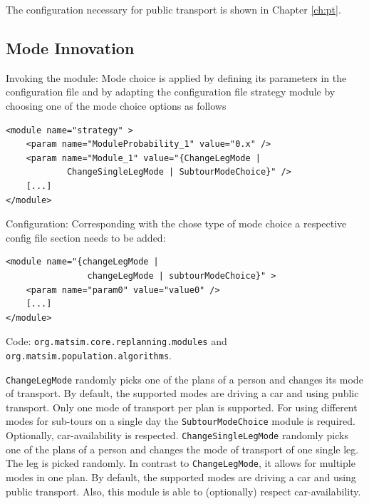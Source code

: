 The configuration necessary for public transport is shown in Chapter \ref{ch:pt}.  

\subsection{Mode Innovation}
\label{sec:modechoice}
\begin{compactitem}
\item Invoking the module: Mode choice is applied by defining its parameters in the configuration file and by adapting the configuration file strategy module by choosing one of the mode choice options as follows
\begin{lstlisting}
<module name="strategy" >
    <param name="ModuleProbability_1" value="0.x" />
    <param name="Module_1" value="{ChangeLegMode |
    		ChangeSingleLegMode | SubtourModeChoice}" />
    [...]
</module>
\end{lstlisting}
%
\item Configuration: Corresponding with the chose type of mode choice a respective config file section needs to be added:
%
\begin{lstlisting}
<module name="{changeLegMode |
				changeLegMode | subtourModeChoice}" >
    <param name="param0" value="value0" />
    [...]
</module>
\end{lstlisting}
%
\item Code: \lstinline|org.matsim.core.replanning.modules| and \lstinline|org.matsim.population.algorithms|.
\end{compactitem}

\lstinline|ChangeLegMode| randomly picks one of the plans of a person and changes its mode of transport. By default, the supported modes are driving a car and using public transport. Only one mode of transport per plan is supported. For using different modes for sub-tours on a single day the \lstinline|SubtourModeChoice| module is required. Optionally, car-availability is respected. \lstinline|ChangeSingleLegMode| randomly picks one of the plans of a person and changes the mode of transport of one single leg. The leg is picked randomly. In contrast to \lstinline|ChangeLegMode|, it allows for multiple modes in one plan. By default, the supported modes are driving a car and using public transport. Also, this module is able to (optionally) respect car-availability.

